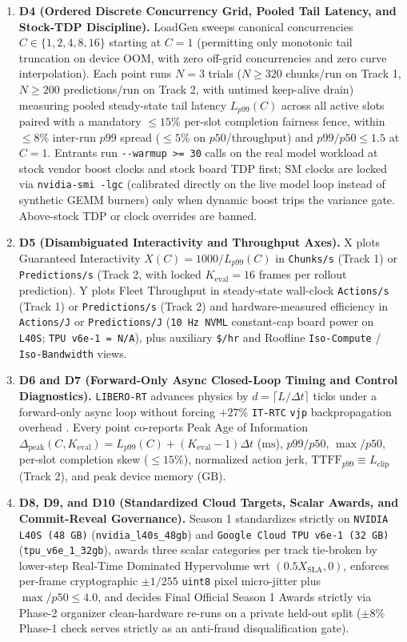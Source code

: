 \documentclass[10pt,letterpaper]{article}
\begin{document}
\begin{enumerate}
    \item \textbf{D4 (Ordered Discrete Concurrency Grid, Pooled Tail Latency, and Stock-TDP Discipline).} LoadGen sweeps canonical concurrencies $C \in \{1, 2, 4, 8, 16\}$ starting at $C = 1$ (permitting only monotonic tail truncation on device OOM, with zero off-grid concurrencies and zero curve interpolation). Each point runs $N = 3$ trials ($N \ge 320$ chunks/run on Track 1, $N \ge 200$ predictions/run on Track 2, with untimed keep-alive drain) measuring pooled steady-state tail latency $L_{p99}(C)$ across all active slots paired with a mandatory $\le 15\%$ per-slot completion fairness fence, within $\le 8\%$ inter-run $p99$ spread ($\le 5\%$ on $p50$/throughput) and $p99 / p50 \le 1.5$ at $C = 1$. Entrants run \texttt{-{}-warmup >= 30} calls on the real model workload at stock vendor boost clocks and stock board TDP first; SM clocks are locked via \texttt{nvidia-smi -lgc} (calibrated directly on the live model loop instead of synthetic GEMM burners) only when dynamic boost trips the variance gate. Above-stock TDP or clock overrides are banned.
    \item \textbf{D5 (Disambiguated Interactivity and Throughput Axes).} X plots Guaranteed Interactivity $X(C) = 1000 / L_{p99}(C)$ in \texttt{Chunks/s} (Track 1) or \texttt{Predictions/s} (Track 2, with locked $K_{\text{eval}} = 16$ frames per rollout prediction). Y plots Fleet Throughput in steady-state wall-clock \texttt{Actions/s} (Track 1) or \texttt{Predictions/s} (Track 2) and hardware-measured efficiency in \texttt{Actions/J} or \texttt{Predictions/J} (\texttt{10 Hz NVML} constant-cap board power on \texttt{L40S}; \texttt{TPU v6e-1 = N/A}), plus auxiliary \texttt{\$/hr} and Roofline \texttt{Iso-Compute} / \texttt{Iso-Bandwidth} views.
    \item \textbf{D6 and D7 (Forward-Only Async Closed-Loop Timing and Control Diagnostics).} \texttt{LIBERO-RT} advances physics by $d = \lceil L / \Delta t \rceil$ ticks under a forward-only async loop without forcing $+27\%$ \texttt{IT-RTC} \texttt{vjp} backpropagation overhead \cite{Black2025realtime,Black2025trainingtime}. Every point co-reports Peak Age of Information $\Delta_{\text{peak}}(C, K_{\text{eval}}) = L_{p99}(C) + (K_{\text{eval}} - 1)\Delta t$ ($\text{ms}$), $p99/p50$, $\max/p50$, per-slot completion skew ($\le 15\%$), normalized action jerk, $\text{TTFF}_{p99} \equiv L_{\text{clip}}$ (Track 2), and peak device memory ($\text{GB}$).
    \item \textbf{D8, D9, and D10 (Standardized Cloud Targets, Scalar Awards, and Commit-Reveal Governance).} Season 1 standardizes strictly on \texttt{NVIDIA L40S (48 GB)} (\texttt{nvidia\_l40s\_48gb}) and \texttt{Google Cloud TPU v6e-1 (32 GB)} (\texttt{tpu\_v6e\_1\_32gb}), awards three scalar categories per track tie-broken by lower-step Real-Time Dominated Hypervolume wrt $(0.5 X_{\text{SLA}}, 0)$, enforces per-frame cryptographic $\pm 1/255$ \texttt{uint8} pixel micro-jitter plus $\max / p50 \le 4.0$, and decides Final Official Season 1 Awards strictly via Phase-2 organizer clean-hardware re-runs on a private held-out split ($\pm 8\%$ Phase-1 check serves strictly as an anti-fraud disqualification gate).
\end{enumerate}
\end{document}
